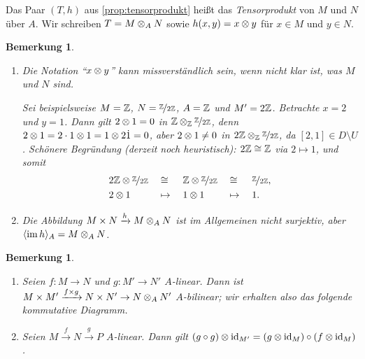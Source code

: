 \documentclass[12pt,a4paper]{scrartcl}
\theoremstyle{cplain}
\theoremstyle{cdef}
\newtheorem{beme}[thmcounter]{Bemerkung}
\begin{document}
\begin{defi}
	Das Paar $(T,h)$ aus \cref{prop:tensorprodukt} heißt das \emph{Tensorprodukt} von $M$ und $N$ über $A$. Wir schreiben $T = M \otimes_A  N$ sowie $h(x,y) = x \otimes y$ für $x \in M$ und $y \in N$.
\end{defi}
\begin{beme}
	\leavevmode
	\begin{enumerate}
		\item Die Notation \enquote{$x \otimes y$} kann missverständlich sein, wenn nicht klar ist, was $M$ und $N$ sind.

		Sei beispielsweise $M=\mathbb Z$, $N= \nicefrac{\mathbb Z}{2\mathbb Z}$, $A = \mathbb Z$ und $M' = 2 \mathbb Z$. Betrachte $x=2$ und $y=1$. Dann gilt $2 \otimes 1 = 0$ in $\mathbb Z \otimes_\mathbb Z \nicefrac{\mathbb Z}{2\mathbb Z}$, denn $2 \otimes 1 = 2 \cdot 1 \otimes 1 = 1 \otimes 2 \dot 1 = 0$, aber $2 \otimes 1 \neq 0$ in $2\mathbb Z \otimes_\mathbb Z \nicefrac{\mathbb Z}{2 \mathbb Z}$, da $[2,1] \in D \setminus U$. Schönere Begründung (derzeit noch heuristisch): $2\mathbb Z \cong \mathbb Z$ via $2 \mapsto 1$, und somit
		\begin{alignat*}{5}
			&2\mathbb Z \otimes \nicefrac{\mathbb Z}{2\mathbb Z} &&\cong &&\mathbb Z \otimes \nicefrac{\mathbb Z}{2\mathbb Z} &&\cong &&\nicefrac{\mathbb Z}{2\mathbb Z}, \\
			&2 \otimes 1 &&\mapsto\; &&1 \otimes 1 &&\mapsto\; &&1.
		\end{alignat*}
		\item Die Abbildung $M \times N \xrightarrow{h} M \otimes_A N$ ist im Allgemeinen nicht surjektiv, aber $\langle\operatorname{im} h\rangle_A = M \otimes_A N$.
	\end{enumerate}
\end{beme}
\begin{beme}
	\leavevmode
	\begin{enumerate}
		\item Seien $f: M \to N$ und $g: M' \to N'$ $A$-linear. Dann ist $M \times M' \xrightarrow{f \times g} N \times N' \to N \otimes_A N'$ $A$-bilinear; wir erhalten also das folgende kommutative Diagramm.
		\begin{figure}[H]
			\centering
		\end{figure}
		\item Seien $M \xrightarrow{f} N \xrightarrow{g} P$ $A$-linear. Dann gilt $(g \circ g) \otimes \operatorname{id}_{M'} = (g \otimes \operatorname{id}_{M}) \circ (f \otimes \operatorname{id}_{M})$.
	\end{enumerate}
\end{beme}
\end{document}
